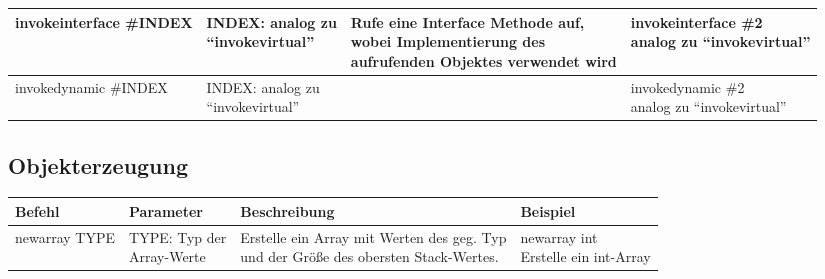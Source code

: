 \begin{table}[h]
\begin{tabular}{l|l|l|l|}
		invokeinterface \#INDEX 
		& \multlineTable{INDEX:  analog zu\\ \enquote{invokevirtual}} 
		& \multlineTable{Rufe eine \textbf{Interface} Methode auf,\\ wobei Implementierung des\\ aufrufenden Objektes verwendet wird} 
		& \multlineTable{invokeinterface \#2 \\ analog zu \enquote{invokevirtual}} \\ \hline
		
		invokedynamic \#INDEX 
		& \multlineTable{INDEX:  analog zu\\ \enquote{invokevirtual}} 
		& \open 
		& \multlineTable{invokedynamic \#2 \\ analog zu \enquote{invokevirtual}} \\ \hline		
	\end{tabular}
\end{table}

\subsection{Objekterzeugung}
\begin{table}[h]
	\centering
	\label{my-label}
	\begin{tabular}{l|l|l|l}
		Befehl & Parameter & Beschreibung & Beispiel \\ \hline
		
		newarray TYPE& \multlineTable{TYPE: Typ der\\ Array-Werte} & \multlineTable{Erstelle ein Array mit Werten des geg. Typ\\ und der Größe des obersten Stack-Wertes.} & \multlineTable{newarray int\\ Erstelle ein int-Array} \\ \hline	
		
	\end{tabular}
\end{table}

